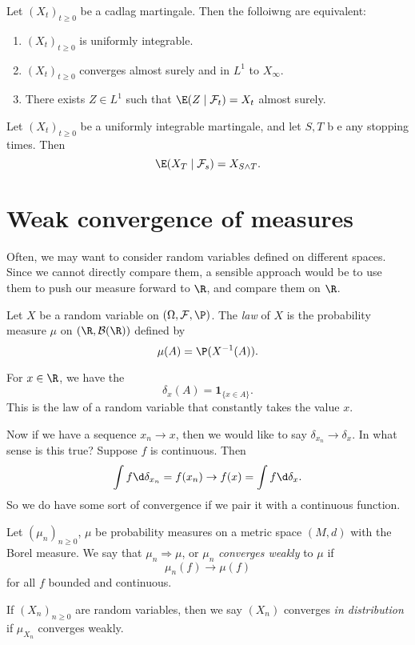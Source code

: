 \documentclass[a4paper]{article}
\begin{document}
\begin{thm}
  Let $(X_t)_{t \geq 0}$ be a cadlag martingale. Then the folloiwng are equivalent:
  \begin{enumerate}
    \item $(X_t)_{t \geq 0}$ is uniformly integrable.
    \item $(X_t)_{t \geq 0}$ converges almost surely and in $L^1$ to $X_\infty$.
    \item There exists $Z \in L^1$ such that $\E(Z \mid \mathcal{F}_t) = X_t$ almost surely.
  \end{enumerate}
\end{thm}

\begin{thm}
  Let $(X_t)_{t \geq 0}$ be a uniformly integrable martingale, and let $S, T$ b e any stopping times. Then
  \[
    \E (X_T \mid \mathcal{F}_s) = X_{S \wedge T}.
  \]
\end{thm}

\section{Weak convergence of measures}
Often, we may want to consider random variables defined on different spaces. Since we cannot directly compare them, a sensible approach would be to use them to push our measure forward to $\R$, and compare them on $\R$.

\begin{defi}[Law]
  Let $X$ be a random variable on $(\Omega, \mathcal{F}, \P)$. The \emph{law} of $X$ is the probability measure $\mu$ on $(\R, \mathcal{B}(\R))$ defined by
  \[
    \mu(A) = \P(X^{-1}(A)).
  \]
\end{defi}

\begin{eg}
  For $x \in \R$, we have the 
  \[
    \delta_x(A) = \mathbf{1}_{\{x \in A\}}.
  \]
  This is the law of a random variable that constantly takes the value $x$.
\end{eg}
Now if we have a sequence $x_n \to x$, then we would like to say $\delta_{x_n} \to \delta_x$. In what sense is this true? Suppose $f$ is continuous. Then
\[
  \int f \d \delta_{x_n} = f(x_n) \to f(x) = \int f \d \delta_x.
\]
So we do have some sort of convergence if we pair it with a continuous function.

\begin{defi}
  Let $(\mu_n)_{n \geq 0}$, $\mu$ be probability measures on a metric space $(M, d)$ with the Borel measure. We say that $\mu_n \Rightarrow \mu$, or $\mu_n$ \emph{converges weakly} to $\mu$ if
  \[
    \mu_n(f) \to \mu(f)
  \]
  for all $f$ bounded and continuous.

  If $(X_n)_{n \geq 0}$ are random variables, then we say $(X_n)$ converges \emph{in distribution} if $\mu_{X_n}$ converges weakly.
\end{defi}
\end{document}

